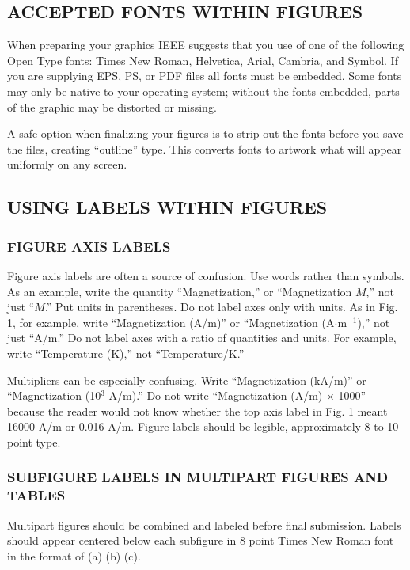 \documentclass{IEEEojcsys}
\begin{document}
\subsection{ACCEPTED FONTS WITHIN FIGURES}

When preparing your graphics IEEE suggests that you use of one of the following Open Type fonts: Times New Roman, Helvetica, Arial, Cambria, and Symbol. If you are supplying EPS, PS, or PDF files all fonts must be embedded. Some fonts may only be native to your operating system; without the fonts embedded, parts of the graphic may be distorted or missing.

A safe option when finalizing your figures is to strip out the fonts before you save the files, creating ``outline'' type. This converts fonts to artwork what will appear uniformly on any screen.

\subsection{USING LABELS WITHIN FIGURES}

\subsubsection{FIGURE AXIS LABELS}

Figure axis labels are often a source of confusion. Use words rather than symbols. As an example, write the quantity ``Magnetization,'' or ``Magnetization $M$,'' not just ``$M$.'' Put units in parentheses. Do not label axes only with units. As in Fig. 1, for example, write ``Magnetization (A/m)'' or ``Magnetization (A$\cdot$m$^{-1}$),'' not just ``A/m.'' Do not label axes with a ratio of quantities and units. For example, write ``Temperature (K),'' not ``Temperature/K.''
 
Multipliers can be especially confusing. Write ``Magnetization (kA/m)'' or ``Magnetization (10$^3$ A/m).'' Do not write ``Magnetization (A/m) $\times$ 1000'' because the reader would not know whether the top axis label in Fig. 1 meant 16000 A/m or 0.016 A/m. Figure labels should be legible, approximately 8 to 10 point type.

\subsubsection{SUBFIGURE LABELS IN MULTIPART FIGURES AND TABLES}

Multipart figures should be combined and labeled before final submission. Labels should appear centered below each subfigure in 8 point Times New Roman font in the format of (a) (b) (c).
\end{document}
